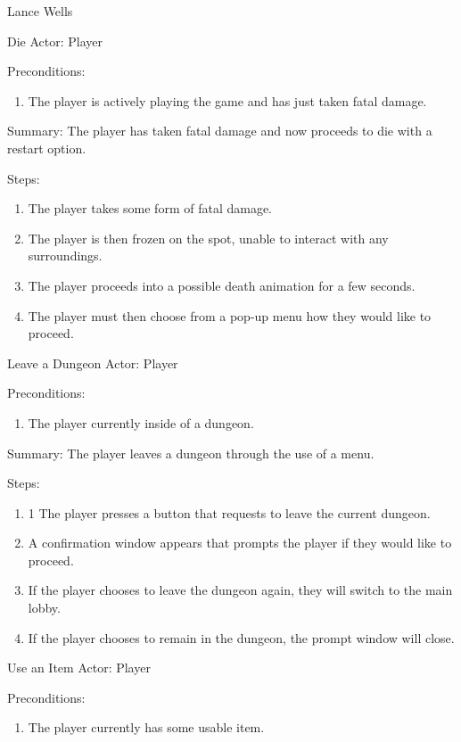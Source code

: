 \documentclass[12pt]{report}
\begin{document}
\begin{section}{Lance Wells}
\begin{subsection}{Die}
Actor: Player

Preconditions:
\begin{enumerate}
\item The player is actively playing the game and has just taken
fatal damage.
\end{enumerate}

Summary: The player has taken fatal damage and now proceeds to die with a
restart option.

Steps:
\begin{enumerate}
\item The player takes some form of fatal damage.
\item The player is then frozen on the spot, unable to interact with any
surroundings.
\item The player proceeds into a possible death animation for a few seconds.
\item The player must then choose from a pop-up menu how they would like to
proceed.
\end{enumerate}
\end{subsection}

\begin{subsection}{Leave a Dungeon}
Actor: Player

Preconditions:
\begin{enumerate}
\item The player currently inside of a dungeon.
\end{enumerate}

Summary: The player leaves a dungeon through the use of a menu.

Steps:
\begin{enumerate}
\item1 The player presses a button that requests to leave the current
dungeon.
\item A confirmation window appears that prompts the player if they would
like to proceed.
\item If the player chooses to leave the dungeon again, they will switch
to the main lobby.
\item If the player chooses to remain in the dungeon, the prompt window will
close.
\end{enumerate}
\end{subsection}

\begin{subsection}{Use an Item}
Actor: Player

Preconditions:
\begin{enumerate}
\item The player currently has some usable item.
\end{enumerate}


\end{subsection}
\end{section}
\end{document}
